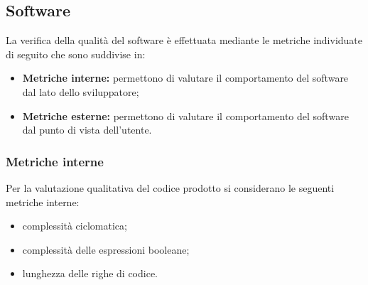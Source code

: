 \subsection{Software}
La verifica della qualità del software è effettuata mediante le metriche individuate di seguito che sono suddivise in:

\begin{itemize}
    \item \textbf{Metriche interne:} permettono di valutare il comportamento del software dal lato dello sviluppatore;
    \item \textbf{Metriche esterne:} permettono di valutare il comportamento del software dal punto di vista dell'utente.
\end{itemize}


\subsubsection{Metriche interne}
Per la valutazione qualitativa del codice prodotto si considerano le seguenti metriche interne:
\begin{itemize}
    \item complessità ciclomatica;
    \item complessità delle espressioni booleane;
    \item lunghezza delle righe di codice.
\end{itemize}

